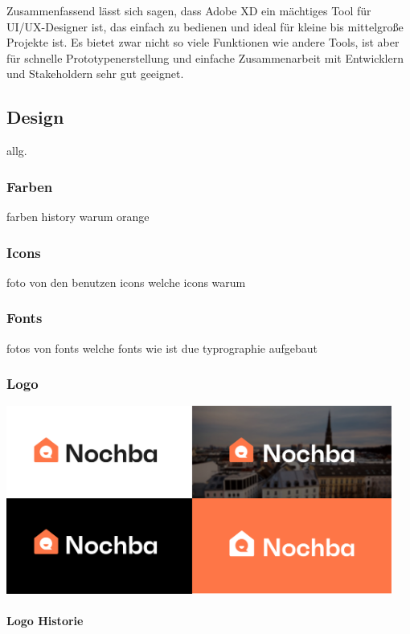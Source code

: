 Zusammenfassend lässt sich sagen, dass Adobe XD ein mächtiges Tool für UI/UX-Designer ist, das einfach zu bedienen und ideal für kleine bis mittelgroße Projekte ist. Es bietet zwar nicht so viele Funktionen wie andere Tools, ist aber für schnelle Prototypenerstellung und einfache Zusammenarbeit mit Entwicklern und Stakeholdern sehr gut geeignet.

\subsection{Design}
allg.


\subsubsection{Farben}
farben history
warum orange
\subsubsection{Icons}
foto von den benutzen icons
welche icons
warum
\subsubsection{Fonts}
fotos von fonts
welche fonts
wie ist due typrographie aufgebaut
\subsubsection{Logo}

\includegraphics[width=0.95\textwidth]{pics/final-logo.png}


\paragraph{Logo Historie}



